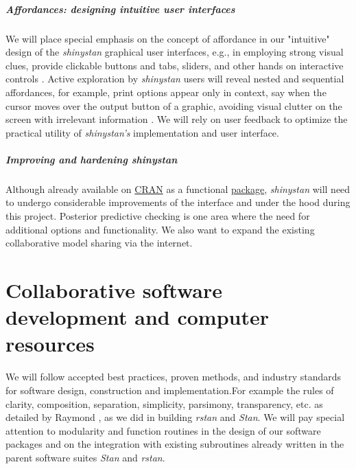 \documentclass[11pt,notitlepage]{article}
\begin{document}
\subparagraph*{Affordances: designing intuitive user interfaces}
We will place special emphasis on the concept of affordance in our "intuitive" 
design of the \textit{shinystan} graphical user interfaces, e.g., in employing 
strong visual clues, provide clickable buttons and tabs, sliders, and other 
hands on interactive controls \cite{NormanAffordances1999}. Active exploration 
by \textit{shinystan} users will reveal nested and sequential affordances, for 
example, print options appear only in context, say when the cursor moves over 
the output button of a graphic, avoiding visual clutter on the screen with 
irrelevant information \cite{Mcgrenere2000affordances}. We will rely on user 
feedback to optimize the practical utility of \textit{shinystan's} implementation 
and user interface.

\subparagraph*{Improving and hardening \textit{shinystan}}
Although already available on 
\href{https://cran.r-project.org/web/packages/shinystan/index.html}{CRAN} 
as a functional \href{https://www.youtube.com/watch?v=X31xqNHcvQs}{package},
\textit{shinystan} will need to undergo considerable improvements of the 
interface and under the hood during this project. Posterior predictive 
checking is one area where the need for additional options and functionality. 
We also want to expand the existing collaborative model sharing via the internet.

\section*{Collaborative software development and computer resources}
We will follow accepted best practices, proven methods, and industry standards for software design, construction and implementation.For example the rules of clarity, composition, separation, simplicity, parsimony, transparency, etc. as detailed by 
Raymond \cite{Raymond2003art}, as we did in building \textit{rstan} and \textit{Stan}. We will pay special attention to modularity 
and function routines in the design of our software packages and on the integration with existing subroutines already written in the 
parent software suites \textit{Stan} and \textit{rstan}. 
\end{document}
